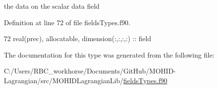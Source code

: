 the data on the scalar data field 



Definition at line 72 of file fields\+Types.\+f90.


\begin{DoxyCode}
72         \textcolor{keywordtype}{real(prec)}, \textcolor{keywordtype}{allocatable}, \textcolor{keywordtype}{dimension(:,:,:,:)} :: field
\end{DoxyCode}


The documentation for this type was generated from the following file\+:\begin{DoxyCompactItemize}
\item 
C\+:/\+Users/\+R\+B\+C\+\_\+workhorse/\+Documents/\+Git\+Hub/\+M\+O\+H\+I\+D-\/\+Lagrangian/src/\+M\+O\+H\+I\+D\+Lagrangian\+Lib/\mbox{\hyperlink{fields_types_8f90}{fields\+Types.\+f90}}\end{DoxyCompactItemize}
